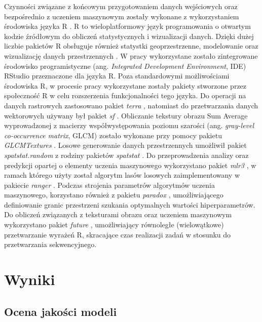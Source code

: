 \documentclass{amuthesis}
\begin{document}
Czynności związane z końcowym przygotowaniem danych wejściowych oraz
bezpośrednio z uczeniem maszynowym zostały wykonane z wykorzystaniem
środowiska języka R \autocite{R-base}. R to wieloplatformowy język
programowania o otwartym kodzie źródłowym do obliczeń statystycznych i
wizualizacji danych. Dzięki dużej liczbie pakietów R obsługuje również
statystki geoprzestrzenne, modelowanie oraz wizualizację danych
przestrzennych \autocite{lovelace_2019_geocomputation}. W pracy
wykorzystane zostało zintegrowane środowisko programistyczne (ang.
\emph{Integrated Development Environment}, IDE) RStudio
\autocite{rstudio_team_2020_rstudio} przeznaczone dla języka R. Poza
standardowymi możliwościami środowiska R, w procesie pracy wykorzystane
zostały pakiety stworzone przez społeczność R w celu rozszerzenia
funkcjonalności tego języka. Do operacji na danych rastrowych
zastosowano pakiet \emph{terra} \autocite{R-terra}, natomiast do
przetwarzania danych wektorowych używany był pakiet \emph{sf}
\autocite{R-sf}. Obliczanie tekstury obrazu Sum Average wyprowadzonej z
macierzy współwystępowania poziomu szarości (ang. \emph{gray-level
co-occurrence matrix}, GLCM) zostało wykonane przy pomocy pakietu
\emph{GLCMTextures} \autocite{R-GLCMTextures}. Losowe generowanie danych
przestrzennych umożliwił pakiet \emph{spatstat.random}
\autocite{R-spatstat.random} z rodziny pakietów \emph{spatstat}
\autocite{R-spatstat}. Do przeprowadzenia analizy oraz predykcji opartej
o elementy uczenia maszynowego wykorzystano pakiet \emph{mlr3}
\autocite{R-mlr3}, w ramach którego użyty został algorytm lasów losowych
zaimplementowany w pakiecie \emph{ranger} \autocite{R-ranger}. Podczas
strojenia parametrów algorytmów uczenia maszynowego, korzystano również
z pakietu \emph{paradox} \autocite{R-paradox}, umożliwiającego
definiowanie granic przestrzeni szukania optymalnych wartości
hiperparametrów. Do obliczeń związanych z teksturami obrazu oraz
uczeniem maszynowym wykorzystano pakiet \emph{future}
\autocite{R-future}, umożliwiający równoległe (wielowątkowe)
przetwarzanie wyrażeń R, skracające czas realizacji zadań w stosunku do
przetwarzania sekwencyjnego.


\hypertarget{sec-wyniki}{%
\chapter{Wyniki}\label{sec-wyniki}}

\hypertarget{ocena-jakoux15bci-modeli}{%
\section{Ocena jakości modeli}\label{ocena-jakoux15bci-modeli}}
\end{document}
